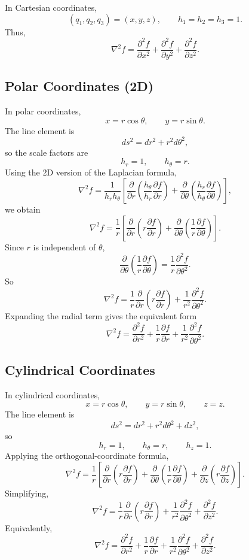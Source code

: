 \documentclass{report}
\numberwithin{equation}{section}
\begin{document}
In Cartesian coordinates,
\[
(q_1,q_2,q_3)=(x,y,z), \qquad h_1=h_2=h_3=1.
\]
Thus,
\[
\nabla^2 f
=
\frac{\partial^2 f}{\partial x^2}
+
\frac{\partial^2 f}{\partial y^2}
+
\frac{\partial^2 f}{\partial z^2}.
\]

\subsection{Polar Coordinates (2D)}

In polar coordinates,
\[
x=r\cos\theta, \qquad y=r\sin\theta.
\]
The line element is
\[
ds^2 = dr^2 + r^2 d\theta^2,
\]
so the scale factors are
\[
h_r=1, \qquad h_\theta=r.
\]
Using the 2D version of the Laplacian formula,
\[
\nabla^2 f
=
\frac{1}{h_r h_\theta}
\left[
\frac{\partial}{\partial r}\left(\frac{h_\theta}{h_r}\frac{\partial f}{\partial r}\right)
+
\frac{\partial}{\partial \theta}\left(\frac{h_r}{h_\theta}\frac{\partial f}{\partial \theta}\right)
\right],
\]
we obtain
\[
\nabla^2 f
=
\frac{1}{r}
\left[
\frac{\partial}{\partial r}\left(r\frac{\partial f}{\partial r}\right)
+
\frac{\partial}{\partial \theta}\left(\frac{1}{r}\frac{\partial f}{\partial \theta}\right)
\right].
\]
Since \(r\) is independent of \(\theta\),
\[
\frac{\partial}{\partial \theta}\left(\frac{1}{r}\frac{\partial f}{\partial \theta}\right)
=
\frac{1}{r}\frac{\partial^2 f}{\partial \theta^2}.
\]
So
\[
\nabla^2 f
=
\frac{1}{r}\frac{\partial}{\partial r}\left(r\frac{\partial f}{\partial r}\right)
+
\frac{1}{r^2}\frac{\partial^2 f}{\partial \theta^2}.
\]
Expanding the radial term gives the equivalent form
\[
\nabla^2 f
=
\frac{\partial^2 f}{\partial r^2}
+
\frac{1}{r}\frac{\partial f}{\partial r}
+
\frac{1}{r^2}\frac{\partial^2 f}{\partial \theta^2}.
\]

\subsection{Cylindrical Coordinates}

In cylindrical coordinates,
\[
x=r\cos\theta,\qquad y=r\sin\theta,\qquad z=z.
\]
The line element is
\[
ds^2 = dr^2 + r^2 d\theta^2 + dz^2,
\]
so
\[
h_r=1,\qquad h_\theta=r,\qquad h_z=1.
\]
Applying the orthogonal-coordinate formula,
\[
\nabla^2 f
=
\frac{1}{r}
\left[
\frac{\partial}{\partial r}\left(r\frac{\partial f}{\partial r}\right)
+
\frac{\partial}{\partial \theta}\left(\frac{1}{r}\frac{\partial f}{\partial \theta}\right)
+
\frac{\partial}{\partial z}\left(r\frac{\partial f}{\partial z}\right)
\right].
\]
Simplifying,
\[
\nabla^2 f
=
\frac{1}{r}\frac{\partial}{\partial r}\left(r\frac{\partial f}{\partial r}\right)
+
\frac{1}{r^2}\frac{\partial^2 f}{\partial \theta^2}
+
\frac{\partial^2 f}{\partial z^2}.
\]
Equivalently,
\[
\nabla^2 f
=
\frac{\partial^2 f}{\partial r^2}
+
\frac{1}{r}\frac{\partial f}{\partial r}
+
\frac{1}{r^2}\frac{\partial^2 f}{\partial \theta^2}
+
\frac{\partial^2 f}{\partial z^2}.
\]
\end{document}
